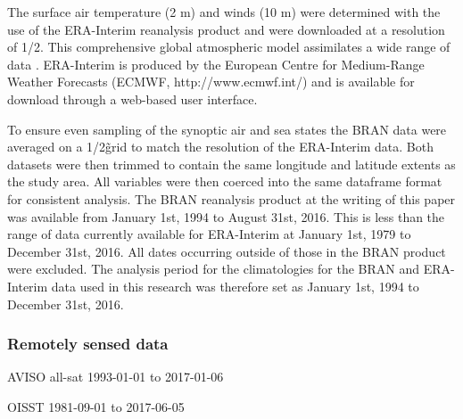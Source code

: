 \documentclass[a4paper,10pt,review]{elsarticle}
\begin{document}
The surface air temperature (2 m) and winds (10 m) were determined with the use of the ERA-Interim reanalysis product and were downloaded at a resolution of 1/2\degree. This comprehensive global atmospheric model assimilates a wide range of data \citep{Dee2011}. ERA-Interim is produced by the European Centre for Medium-Range Weather Forecasts (ECMWF, http://www.ecmwf.int/) and is available for download through a web-based user interface.

To ensure even sampling of the synoptic air and sea states the BRAN data were averaged on a 1/2\degree\~ grid to match the resolution of the ERA-Interim data. Both datasets were then trimmed to contain the same longitude and latitude extents as the study area. All variables were then coerced into the same dataframe format for consistent analysis. The BRAN reanalysis product at the writing of this paper was available from January 1st, 1994 to August 31st, 2016. This is less than the range of data currently available for ERA-Interim at January 1st, 1979 to December 31st, 2016. All dates occurring outside of those in the BRAN product were excluded. The analysis period for the climatologies for the BRAN and ERA-Interim data used in this research was therefore set as January 1st, 1994 to December 31st, 2016.

\subsubsection{Remotely sensed data}

AVISO all-sat
1993-01-01 to 2017-01-06

OISST
1981-09-01 to 2017-06-05
\end{document}
